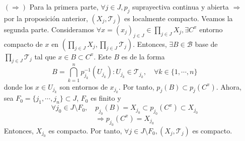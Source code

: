 \begin{dem}
  \begin{enumerate}[label=(\roman*)]
    \item []
    \item [$(\Rightarrow)$] Para la primera parte, $\forall j \in J, p_{j}$ suprayectiva continua y abierta $\Rightarrow$ por la proposición anterior, $( X_{j}, \mathcal{T}_{j} )$ es localmente compacto. Veamos la segunda parte. Consideramos $\forall x = ( x_{j} )_{j \in J} \in \prod_{j \in J} X_{j}, \exists C^{x}$ entorno compacto de $x$ en $( \prod_{j \in J} X_{j}, \prod_{j \in J} \mathcal{T}_{j} )$. Entonces, $\exists B \in \mathcal{B}$ base de $\prod_{j \in J} \mathcal{T}_{j}$ tal que $x \in B \subset C^{x}$. Este $B$ es de la forma
      \[ 
        B = \bigcap_{k = 1}^{n} p_{j_{k}}^{-1}(U_{j_{k}}) : U_{j_{k}} \in \mathcal{T}_{j_{k}}, \quad \forall k \in \{ 1, \cdots, n \} 
      \] 
      donde los $x \in U_{j_{k}}$ son entornos de $x_{j_{k}}$. Por tanto, $p_{j}(B) \subset p_{j}(C^{x})$. Ahora, sea $F_{0} = \{ j_{1}, \cdots, j_{n} \}\subset J$, $F_{0}$ es finito y
      \[
        \forall j_{0} \in J \setminus F_{0}, \quad p_{j_{0}}(B) = X_{j_{0}} \subset p_{j_{0}}(C^{x}) \subset X_{j_{0}}
      \]
      \[ 
        \Rightarrow p_{j_{0}}(C^{x}) = X_{j_{0}}
      \] 
      Entonces, $X_{j_{0}}$ es compacto. Por tanto, $\forall j \in J \setminus F_{0}, ( X_{j}, \mathcal{T}_{j} )$ es compacto.


\end{enumerate}
\end{dem}
